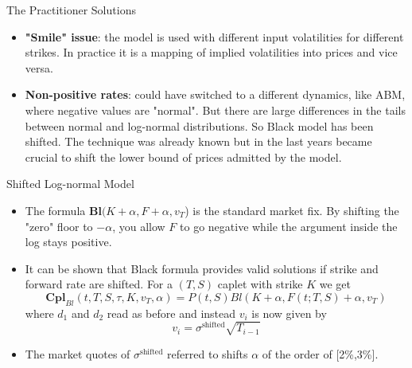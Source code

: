 \documentclass{beamer}
\begin{document}
\begin{frame}{The Practitioner Solutions}
	\begin{itemize}
		\item \textbf{"Smile" issue}: the model is used with \textcolor{maincolor}{different input volatilities for different strikes}. In practice it is a mapping of implied volatilities into prices and vice versa.
		\item \textbf{Non-positive rates}: could have switched to a different dynamics, like ABM, where negative values are "normal". But there are large differences in the tails between normal and log-normal distributions.
		So Black model has been \textcolor{maincolor}{shifted}. The technique was already known but in the last years became crucial to shift the lower bound of prices admitted by the model.
	\end{itemize}
\end{frame}

\begin{frame}{Shifted Log-normal Model }
	\begin{itemize}
		\item The formula $\textbf{Bl}(K+\alpha,F+\alpha,v_T$) is the standard market fix. By shifting the "zero" floor to $-\alpha$, you allow $F$ to go negative while the argument inside the log stays positive.
		\item It can be shown that Black formula provides valid solutions if strike and forward rate are \textcolor{maincolor}{shifted}. For a $(T,S)$ caplet with strike $K$ we get
		\begin{equation}
			\textbf{Cpl}_{Bl}(t,T,S,\tau,K,v_T,\alpha) = P(t,S) Bl(K+\alpha,F(t;T,S)+\alpha,v_T)
		\end{equation}
		where $d_1$ and $d_2$ read as before and instead $v_i$ is now given by
		\begin{equation*}
			v_i = \sigma^{\text{shifted}}\sqrt{T_{i-1}}
		\end{equation*}
		\item The market quotes of $\sigma^{\text{shifted}}$ referred to shifts $\alpha$ of the order of [2\%,3\%].
	\end{itemize}
\end{frame}
\end{document}
